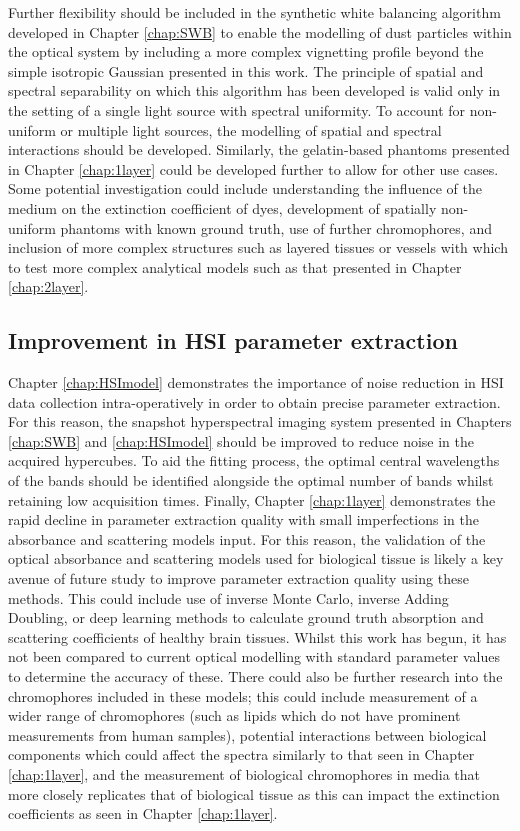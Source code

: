 Further flexibility should be included in the synthetic white balancing algorithm developed in Chapter \ref{chap:SWB} to enable the modelling of dust particles within the optical system by including a more complex vignetting profile beyond the simple isotropic Gaussian presented in this work. The principle of spatial and spectral separability on which this algorithm has been developed is valid only in the setting of a single light source with spectral uniformity. To account for non-uniform or multiple light sources, the modelling of spatial and spectral interactions should be developed. Similarly, the gelatin-based phantoms presented in Chapter \ref{chap:1layer} could be developed further to allow for other use cases. Some potential investigation could include understanding the influence of the medium on the extinction coefficient of dyes, development of spatially non-uniform phantoms with known ground truth, use of further chromophores, and inclusion of more complex structures such as layered tissues or vessels with which to test more complex analytical models such as that presented in Chapter \ref{chap:2layer}. 

\subsection{Improvement in HSI parameter extraction}
Chapter \ref{chap:HSImodel} demonstrates the importance of noise reduction in HSI data collection intra-operatively in order to obtain precise parameter extraction. For this reason, the snapshot hyperspectral imaging system presented in Chapters \ref{chap:SWB} and \ref{chap:HSImodel} should be improved to reduce noise in the acquired hypercubes. To aid the fitting process, the optimal central wavelengths of the bands should be identified alongside the optimal number of bands whilst retaining low acquisition times. Finally, Chapter \ref{chap:1layer} demonstrates the rapid decline in parameter extraction quality with small imperfections in the absorbance and scattering models input. For this reason, the validation of the optical absorbance and scattering models used for biological tissue is likely a key avenue of future study to improve parameter extraction quality using these methods. This could include use of inverse Monte Carlo, inverse Adding Doubling, or deep learning methods to calculate ground truth absorption and scattering coefficients of healthy brain tissues. Whilst this work has begun, it has not been compared to current optical modelling with standard parameter values to determine the accuracy of these\cite{Sabino2016, Eggert1987, Shapey2022, Hokr2021}. There could also be further research into the chromophores included in these models; this could include measurement of a wider range of chromophores (such as lipids which do not have prominent measurements from human samples), potential interactions between biological components which could affect the spectra similarly to that seen in Chapter \ref{chap:1layer}, and the measurement of biological chromophores in media that more closely replicates that of biological tissue as this can impact the extinction coefficients as seen in Chapter \ref{chap:1layer}.